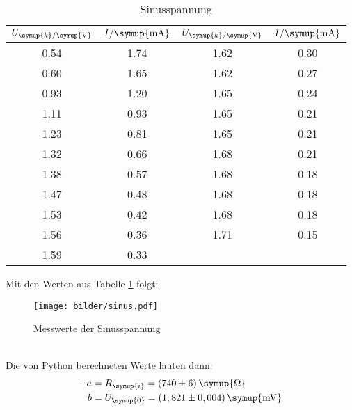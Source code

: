 \begin{table}[H]
  \centering
  \begin{tabular}{c c c c}
    \toprule
    $U_{\symup{k}/\symup{\si{\volt}}}$ & $I/\symup{\si{\milli\ampere}}$  &
    $U_{\symup{k}/\symup{\si{\volt}}}$ & $I/\symup{\si{\milli\ampere}}$  \\
    \midrule
    0.54   &  1.74  &  1.62  &  0.30  \\
    0.60   &  1.65  &  1.62  &  0.27  \\
    0.93   &  1.20  &  1.65  &  0.24  \\
    1.11   &  0.93  &  1.65  &  0.21  \\
    1.23   &  0.81  &  1.65  &  0.21  \\
    1.32   &  0.66  &  1.68  &  0.21  \\
    1.38   &  0.57  &  1.68  &  0.18  \\
    1.47   &  0.48  &  1.68  &  0.18  \\
    1.53   &  0.42  &  1.68  &  0.18  \\
    1.56   &  0.36  &  1.71  &  0.15  \\
    1.59   &  0.33  &  \hrulefill  & \hrulefill  \\
    \bottomrule
  \end{tabular}
  \caption{Sinusspannung}
  \label{tab:sin}
\end{table}
Mit den Werten aus Tabelle \ref{tab:sin} folgt:
\begin{figure}[h]
  \centering
  \texttt{[image: bilder/sinus.pdf]}
  \caption{Messwerte der Sinusspannung}
  \label{fig:si}
\end{figure}
\\
Die von Python berechneten Werte lauten dann:
\begin{align*}
   -a &= R_\symup{i} = (740 \pm 6)\, \symup{\si{\ohm}} \\ %
   b &= U_\symup{0} = (1,821 \pm 0,004)\,\symup{\si{\milli\volt}}
\end{align*}
